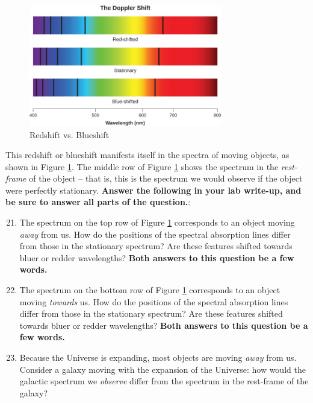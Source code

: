 \documentclass[11pt]{article}
\begin{document}
\begin{figure}[h!]
    \centering
    \includegraphics[width=0.75\textwidth]{Images/redshift.jpg}
    \caption{Redshift vs. Blueshift}
    \label{fig:redshift}
\end{figure}

\medskip \noindent
This redshift or blueshift manifests itself in the spectra of moving objects, as shown in Figure \ref{fig:redshift}. The middle row of Figure \ref{fig:redshift} shows the spectrum in the \emph{rest-frame} of the object -- that is, this is the spectrum we would observe if the object were perfectly stationary. \textbf{Answer the following in your lab write-up, and be sure to answer all parts of the question.}:

\begin{enumerate}
    \setcounter{enumi}{20}
    
    \item The spectrum on the top row of Figure \ref{fig:redshift} corresponds to an object moving \emph{away} from us. How do the positions of the spectral absorption lines differ from those in the stationary spectrum? Are these features shifted towards bluer or redder wavelengths? \textbf{Both answers to this question be a few words.}
    
    \item The spectrum on the bottom row of Figure \ref{fig:redshift} corresponds to an object moving \emph{towards} us. How do the positions of the spectral absorption lines differ from those in the stationary spectrum? Are these features shifted towards bluer or redder wavelengths? \textbf{Both answers to this question be a few words.}
    
    \item Because the Universe is expanding, most objects are moving \emph{away} from us. Consider a galaxy moving with the expansion of the Universe: how would the galactic spectrum we \emph{observe} differ from the spectrum in the rest-frame of the galaxy? 
\end{enumerate}
\end{document}
